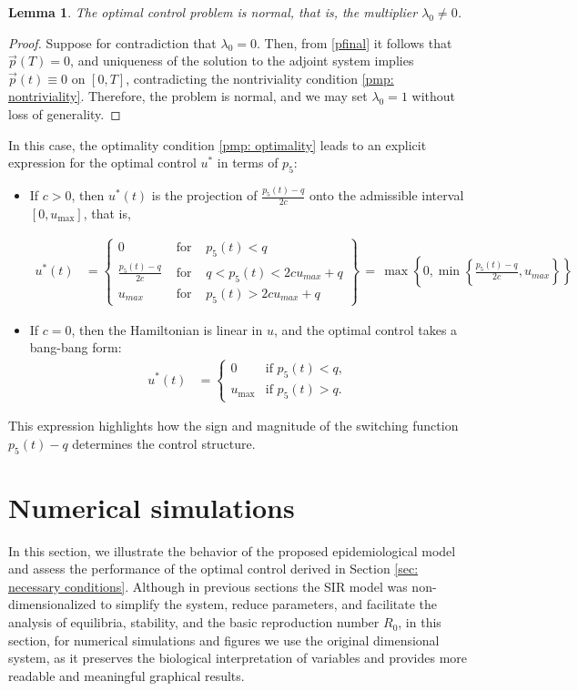 \documentclass{amsart}
\newtheorem{lema}[thm]{Lemma}
\theoremstyle{definition}
\theoremstyle{remark}
\numberwithin{equation}{section}
\begin{document}
\begin{lema}\label{le: normal}
The optimal control problem is normal, that is, the multiplier $\lambda_0 \neq 0$.
\end{lema}
\begin{proof}
Suppose for contradiction that $\lambda_0 = 0$. Then, from \eqref{pfinal} it follows that $\vec{p}(T) = 0$, and uniqueness of the solution to the adjoint system implies $\vec{p}(t) \equiv 0$ on $[0,T]$, contradicting the nontriviality condition \eqref{pmp: nontriviality}. Therefore, the problem is normal, and we may set $\lambda_0 = 1$ without loss of generality.
\end{proof}

In this case, the optimality condition \eqref{pmp: optimality} leads to an explicit expression for the optimal control $u^*$ in terms of $p_5$:
\begin{itemize}
	\item If $c > 0$, then $u^*(t)$ is the projection of $\frac{p_5(t) - q}{2c}$ onto the admissible interval $[0, u_{\max}]$, that is,
	
	\begin{align} \label{eq: u*_c_mayor_0}
		u^*(t)&=\left\{ \begin{matrix}0&\text{ for }& p_5(t)<q \\ \frac{p_5(t)-q}{2 c} &\text{ for } & q< p_5(t)<2 c u_{max}+q \\u_{max} & \text{ for} & p_5(t)>2cu_{max}+q\end{matrix} \right\}  \, = \, \max\left\{0,\min\left\{\frac{p_5(t)-q}{2c},u_{max}\right\}\right\} 
	\end{align}
	
	\item If $c = 0$, then the Hamiltonian is linear in $u$, and the optimal control takes a bang-bang form:
\begin{align} \label{eq: u*_c_igual_0}
	u^*(t) & =
	\left\{ \begin{matrix}
		0 & \text{if } p_5(t) < q, \\
		u_{\max} & \text{if } p_5(t) > q.
\end{matrix} \right. 
	\end{align}
\end{itemize}
This expression highlights how the sign and magnitude of the switching function $p_5(t) - q$ determines the control structure.

\section{Numerical simulations}\label{section 5}
In this section, we illustrate the behavior of the proposed epidemiological model and assess the performance of the optimal control derived in Section \ref{sec: necessary conditions}.
Although in previous sections the SIR model was non-dimensionalized to simplify the system, reduce parameters, and facilitate the analysis of equilibria, stability, and the basic reproduction number 
$R_0$, in this section, for numerical simulations and figures we use the original dimensional system, as it preserves the biological interpretation of variables and provides more readable and meaningful graphical results.
\end{document}
